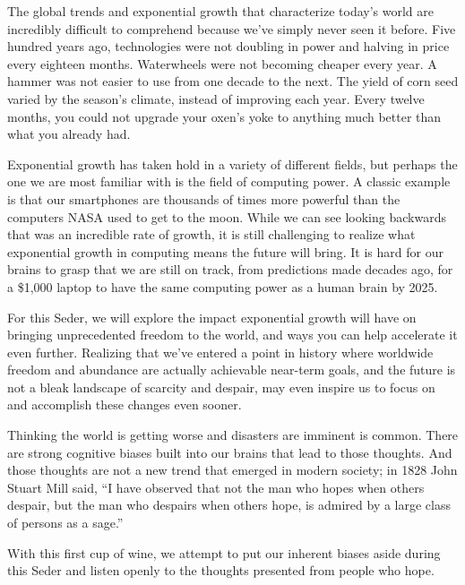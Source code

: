 {  The global trends and exponential growth that characterize today's world are
  incredibly difficult to comprehend because we've simply never seen it before.
  Five hundred years ago, technologies were not doubling in power and halving in
  price every eighteen months. Waterwheels were not becoming cheaper every year.
  A hammer was not easier to use from one decade to the next. The yield of corn
  seed varied by the season's climate, instead of improving each year. Every
  twelve months, you could not upgrade your oxen's yoke to anything much better
  than what you already had.

  Exponential growth has taken hold in a variety of different fields, but
  perhaps the one we are most familiar with is the field of computing power. A
  classic example is that our smartphones are thousands of times more powerful
  than the computers NASA used to get to the moon. While we can see looking
  backwards that was an incredible rate of growth, it is still challenging to
  realize what exponential growth in computing means the future will bring. It
  is hard for our brains to grasp that we are still on track, from predictions
  made decades ago, for a \$1,000 laptop to have the same computing power as a
  human brain by 2025.

  \newReading For this Seder, we will explore the impact exponential growth will
  have on bringing unprecedented freedom to the world, and ways you can help
  accelerate it even further. Realizing that we've entered a point in history
  where worldwide freedom and abundance are actually achievable near-term goals,
  and the future is not a bleak landscape of scarcity and despair, may even
  inspire us to focus on and accomplish these changes even sooner.

  Thinking the world is getting worse and disasters are imminent is common.
  There are strong cognitive biases built into our brains that lead to those
  thoughts. And those thoughts are not a new trend that emerged in modern
  society; in 1828 John Stuart Mill said, ``I have observed that not the man who
  hopes when others despair, but the man who despairs when others hope, is
  admired by a large class of persons as a sage.''

  With this first cup of wine, we attempt to put our inherent biases aside
  during this Seder and listen openly to the thoughts presented from people who
  hope.
}

